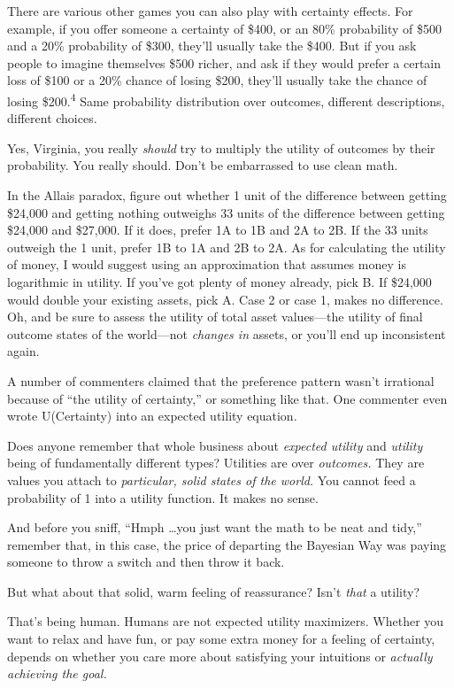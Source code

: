 {
 There are various other games you can also play with certainty
effects. For example, if you offer someone a certainty of \$400, or an
80\% probability of \$500 and a 20\% probability of \$300,
they'll usually take the \$400. But if you ask people
to imagine themselves \$500 richer, and ask if they would prefer a
certain loss of \$100 or a 20\% chance of losing \$200,
they'll usually take the chance of losing
\$200.\textsuperscript{4} Same probability distribution over outcomes,
different descriptions, different choices.}

{
 Yes, Virginia, you really \textit{should} try to multiply the
utility of outcomes by their probability. You really should.
Don't be embarrassed to use clean math.}

{
 In the Allais paradox, figure out whether 1 unit of the difference
between getting \$24,000 and getting nothing outweighs 33 units of the
difference between getting \$24,000 and \$27,000. If it does, prefer 1A
to 1B and 2A to 2B. If the 33 units outweigh the 1 unit, prefer 1B to
1A and 2B to 2A. As for calculating the utility of money, I would
suggest using an approximation that assumes money is logarithmic in
utility. If you've got plenty of money already, pick B.
If \$24,000 would double your existing assets, pick A. Case 2 or case
1, makes no difference. Oh, and be sure to assess the utility of total
asset values---the utility of final outcome states of the world---not
\textit{changes in} assets, or you'll end up
inconsistent again.}

{
 A number of commenters claimed that the preference pattern
wasn't irrational because of ``the
utility of certainty,'' or something like that. One
commenter even wrote U(Certainty) into an expected utility equation.}

{
 Does anyone remember that whole business about \textit{expected
utility} and \textit{utility} being of fundamentally different types?
Utilities are over \textit{outcomes.} They are values you attach to
\textit{particular, solid states of the world.} You cannot feed a
probability of 1 into a utility function. It makes no sense.}

{
 And before you sniff, ``Hmph \ldots you just want
the math to be neat and tidy,'' remember that, in
this case, the price of departing the Bayesian Way was paying someone
to throw a switch and then throw it back.}

{
 But what about that solid, warm feeling of reassurance?
Isn't \textit{that} a utility?}

{
 That's being human. Humans are not expected
utility maximizers. Whether you want to relax and have fun, or pay some
extra money for a feeling of certainty, depends on whether you care
more about satisfying your intuitions or \textit{actually achieving the
goal.}}

